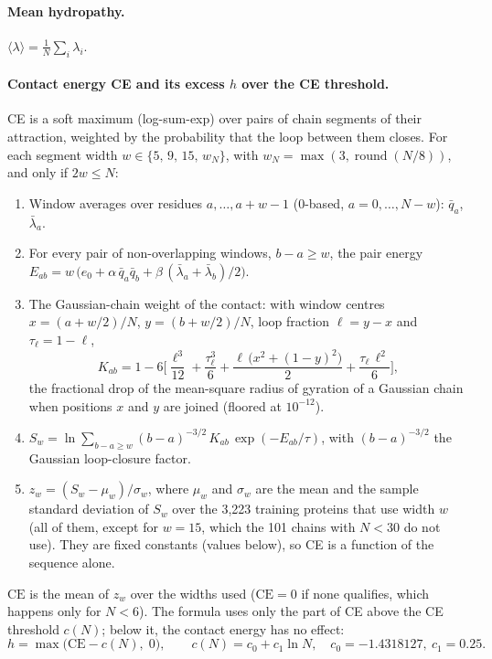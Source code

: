\documentclass[11pt]{article}
\newcommand{\lam}{\langle\lambda\rangle}
\begin{document}
\paragraph{Mean hydropathy.} $\lam=\frac1N\sum_i\lambda_i$.

\paragraph{Contact energy CE and its excess $h$ over the CE threshold.} CE is a soft maximum (log-sum-exp) over pairs of chain segments of
their attraction, weighted by the probability that the loop between them closes. For each segment width $w\in\{5,\,9,\,15,\,w_N\}$, with
$w_N=\max(3,\operatorname{round}(N/8))$, and only if $2w\le N$:
\begin{enumerate}
\item Window averages over residues $a,\dots,a+w-1$ (0-based, $a=0,\dots,N-w$): $\bar q_a$, $\bar\lambda_a$.
\item For every pair of non-overlapping windows, $b-a\ge w$, the pair energy
  $E_{ab}=w\,\big(e_0+\alpha\,\bar q_a\bar q_b+\beta\,(\bar\lambda_a+\bar\lambda_b)/2\big)$.
\item The Gaussian-chain weight of the contact: with window centres $x=(a+w/2)/N$, $y=(b+w/2)/N$, loop fraction
  $\ell=y-x$ and $\tau_\ell=1-\ell$,
  \[
  K_{ab}=1-6\Big[\frac{\ell^3}{12}+\frac{\tau_\ell^3}{6}+\frac{\ell\,\big(x^2+(1-y)^2\big)}{2}+\frac{\tau_\ell\,\ell^2}{6}\Big],
  \]
  the fractional drop of the mean-square radius of gyration of a Gaussian chain when positions $x$ and $y$ are joined
  (floored at $10^{-12}$).
\item $S_w=\ln\sum_{b-a\ge w}(b-a)^{-3/2}\,K_{ab}\,\exp(-E_{ab}/\tau)$, with $(b-a)^{-3/2}$ the Gaussian
  loop-closure factor.
\item $z_w=(S_w-\mu_w)/\sigma_w$, where $\mu_w$ and $\sigma_w$ are the mean and the sample standard deviation of $S_w$
  over the 3{,}223 training proteins that use width $w$ (all of them, except for $w=15$, which the 101 chains with
  $N<30$ do not use). They are fixed constants (values below), so CE is a function of the sequence alone.
\end{enumerate}
$\mathrm{CE}$ is the mean of $z_w$ over the widths used ($\mathrm{CE}=0$ if none qualifies, which happens only for $N<6$).
The formula uses only the part of CE above the CE threshold $c(N)$; below it, the contact energy has no effect:
\begin{equation}
h=\max\big(\mathrm{CE}-c(N),\;0\big),\qquad c(N)=c_0+c_1\ln N,\quad c_0=-1.4318127,\ c_1=0.25 .
\end{equation}
\end{document}

